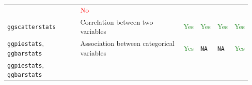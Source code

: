\documentclass[
]{article}
\begin{document}
\begin{longtable}[]{@{}llllll@{}}
\begin{minipage}[t]{0.08\columnwidth}
\end{minipage} & \begin{minipage}[t]{0.10\columnwidth}\raggedright
\textcolor{red}{No}\strut
\end{minipage}\tabularnewline
\begin{minipage}[t]{0.14\columnwidth}\raggedright
\texttt{ggscatterstats}\strut
\end{minipage} & \begin{minipage}[t]{0.35\columnwidth}\raggedright
Correlation between two variables\strut
\end{minipage} & \begin{minipage}[t]{0.08\columnwidth}\raggedright
\textcolor{ForestGreen}{Yes}\strut
\end{minipage} & \begin{minipage}[t]{0.10\columnwidth}\raggedright
\textcolor{ForestGreen}{Yes}\strut
\end{minipage} & \begin{minipage}[t]{0.08\columnwidth}\raggedright
\textcolor{ForestGreen}{Yes}\strut
\end{minipage} & \begin{minipage}[t]{0.10\columnwidth}\raggedright
\textcolor{ForestGreen}{Yes}\strut
\end{minipage}\tabularnewline
\begin{minipage}[t]{0.14\columnwidth}\raggedright
\texttt{ggpiestats}, \texttt{ggbarstats}\strut
\end{minipage} & \begin{minipage}[t]{0.35\columnwidth}\raggedright
Association between categorical variables\strut
\end{minipage} & \begin{minipage}[t]{0.08\columnwidth}\raggedright
\textcolor{ForestGreen}{Yes}\strut
\end{minipage} & \begin{minipage}[t]{0.10\columnwidth}\raggedright
\texttt{NA}\strut
\end{minipage} & \begin{minipage}[t]{0.08\columnwidth}\raggedright
\texttt{NA}\strut
\end{minipage} & \begin{minipage}[t]{0.10\columnwidth}\raggedright
\textcolor{ForestGreen}{Yes}\strut
\end{minipage}\tabularnewline
\begin{minipage}[t]{0.14\columnwidth}\raggedright
\texttt{ggpiestats}, \texttt{ggbarstats}\strut
\end{minipage} & \begin{minipage}[t]{0.35\columnwidth}\raggedright

\end{minipage}
\end{longtable}
\end{document}
